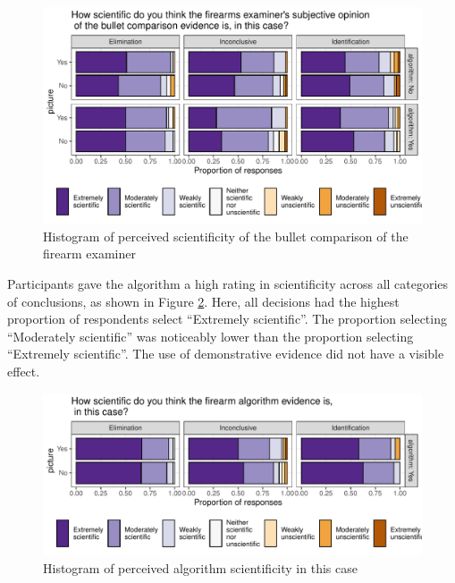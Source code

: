 \documentclass[print]{nuthesis}
\begin{document}
\begin{figure}

{\centering \includegraphics[width=\linewidth]{thesis_files/figure-latex/examsci-1} 

}

\caption{Histogram of perceived scientificity of the bullet comparison of the firearm examiner}\label{fig:examsci}
\end{figure}

Participants gave the algorithm a high rating in scientificity across all categories of conclusions, as shown in Figure \ref{fig:algsci}.
Here, all decisions had the highest proportion of respondents select ``Extremely scientific''.
The proportion selecting ``Moderately scientific'' was noticeably lower than the proportion selecting ``Extremely scientific''.
The use of demonstrative evidence did not have a visible effect.

\begin{figure}

{\centering \includegraphics[width=\linewidth]{thesis_files/figure-latex/algsci-1} 

}

\caption{Histogram of perceived algorithm scientificity in this case}\label{fig:algsci}
\end{figure}
\end{document}
